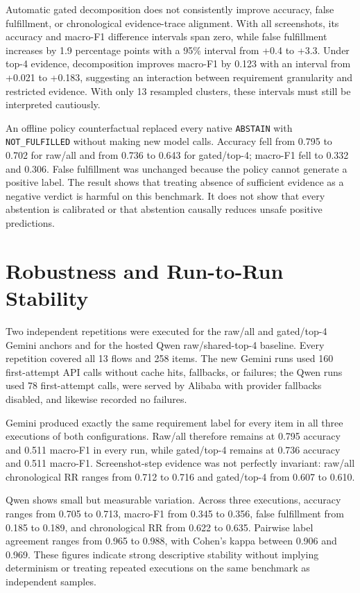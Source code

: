 Automatic gated decomposition does not consistently improve accuracy, false
fulfillment, or chronological evidence-trace alignment. With all screenshots,
its accuracy and macro-F1 difference intervals span zero, while false
fulfillment increases by 1.9 percentage points with a 95\% interval from +0.4
to +3.3. Under top-4 evidence, decomposition improves macro-F1 by 0.123 with an
interval from +0.021 to +0.183, suggesting an interaction between requirement
granularity and restricted evidence. With only 13 resampled clusters, these
intervals must still be interpreted cautiously.

An offline policy counterfactual replaced every native \texttt{ABSTAIN} with \texttt{NOT\_FULFILLED} without making new model calls. Accuracy fell from 0.795 to 0.702 for raw/all and from 0.736 to 0.643 for gated/top-4; macro-F1 fell to 0.332 and 0.306. False fulfillment was unchanged because the policy cannot generate a positive label. The result shows that treating absence of sufficient evidence as a negative verdict is harmful on this benchmark. It does not show that every abstention is calibrated or that abstention causally reduces unsafe positive predictions.

\section{Robustness and Run-to-Run Stability}\label{robustness-and-run-to-run-stability}

Two independent repetitions were executed for the raw/all and gated/top-4
Gemini anchors and for the hosted Qwen raw/shared-top-4 baseline. Every
repetition covered all 13 flows and 258 items. The new Gemini runs used 160
first-attempt API calls without cache hits, fallbacks, or failures; the Qwen
runs used 78 first-attempt calls, were served by Alibaba with provider fallbacks
disabled, and likewise recorded no failures.

Gemini produced exactly the same requirement label for every item in all three
executions of both configurations. Raw/all therefore remains at 0.795 accuracy
and 0.511 macro-F1 in every run, while gated/top-4 remains at 0.736 accuracy and
0.511 macro-F1. Screenshot-step evidence was not perfectly invariant: raw/all
chronological RR ranges from 0.712 to 0.716 and gated/top-4 from 0.607 to 0.610.

Qwen shows small but measurable variation. Across three executions, accuracy
ranges from 0.705 to 0.713, macro-F1 from 0.345 to 0.356, false fulfillment from
0.185 to 0.189, and chronological RR from 0.622 to 0.635. Pairwise label agreement
ranges from 0.965 to 0.988, with Cohen's kappa between 0.906 and 0.969. These
figures indicate strong descriptive stability without implying determinism or
treating repeated executions on the same benchmark as independent samples.

